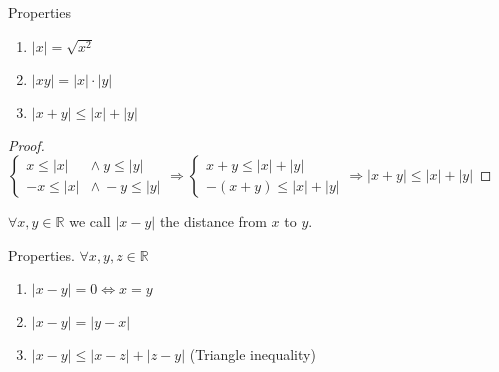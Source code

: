 \documentclass[12pt, a4paper]{book}
\begin{document}
\begin{prop}
  Properties
  \begin{enumerate}[label=\emph{\alph*})]
    \item $|x| = \sqrt{x^2}$
    \item $|xy| = |x|\cdot |y|$
    \item $|x+y| \leq |x| + |y|$
  \end{enumerate}
  \begin{proof}
    $\begin{cases}
      x\leq |x| & \wedge\ y\leq |y| \\
      -x\leq |x| & \wedge\ -y\leq |y|
    \end{cases} \Rightarrow 
    \begin{cases}
      x+y \leq |x|+|y| \\
      -(x+y) \leq |x|+|y|
    \end{cases} \Rightarrow
    |x+y|\leq |x|+|y|$
  \end{proof}
\end{prop}

\begin{defn}
  $\forall x,y\in\mathbb{R}$ we call $|x-y|$ the distance from $x$ to $y$.
\end{defn}

\begin{proposition}
  Properties. $\forall x,y,z \in\mathbb{R}$
  \begin{enumerate}[label=\emph{\alph*})]
    \item $|x-y|=0 \Leftrightarrow x=y$
    \item $|x-y| = |y-x|$
    \item $|x-y| \leq |x-z| + |z-y|$ (Triangle inequality)
  \end{enumerate}
\end{proposition}
\end{document}
